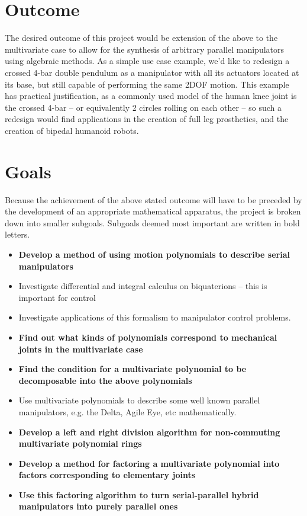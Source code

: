 \section{Outcome}
The desired outcome of this project would be extension of the above to the multivariate case to allow for the synthesis of arbitrary parallel manipulators using algebraic methods.
As a simple use case example, we'd like to redesign a crossed 4-bar double pendulum as a manipulator with all its actuators located at its base, but still capable of performing the same 2DOF motion. This example has practical justification, as a commonly used model of the human knee joint is the crossed 4-bar -- or equivalently 2 circles rolling on each other -- so such a redesign would find applications in the creation of full leg prosthetics, and the creation of bipedal humanoid robots.
\section{Goals}
Because the achievement of the above stated outcome will have to be preceded by the development of an appropriate mathematical apparatus, the project is broken down into smaller subgoals. Subgoals deemed most important are written in bold letters.
\begin{itemize}
    \item \textbf{Develop a method of using motion polynomials to describe serial manipulators}
    \item Investigate differential and integral calculus on biquaterions -- this is important for control
    \item Investigate applications of this formalism to manipulator control problems. 
    \item \textbf{Find out what kinds of polynomials correspond to mechanical joints in the multivariate case}
    \item \textbf{Find the condition for a multivariate polynomial to be decomposable into the above polynomials}
    \item Use multivariate polynomials to describe some well known parallel manipulators, e.g. the Delta, Agile Eye, etc mathematically.
    \item \textbf{Develop a left and right division algorithm for non-commuting multivariate polynomial rings}
    \item \textbf{Develop a method for factoring a multivariate polynomial into factors corresponding to elementary joints}
    \item \textbf{Use this factoring algorithm to turn serial-parallel hybrid manipulators into purely parallel ones}
\end{itemize}

